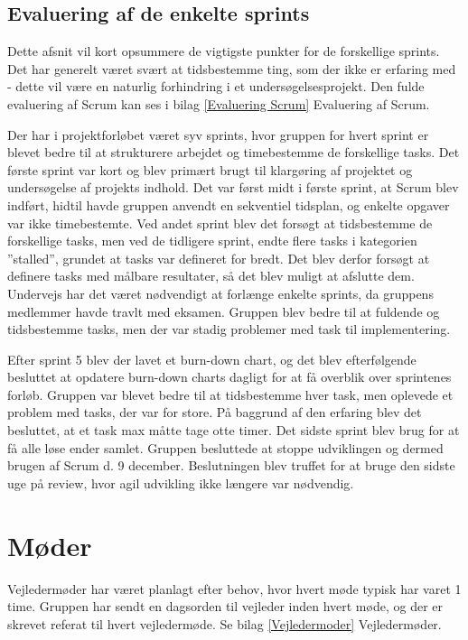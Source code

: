 \subsection{Evaluering af de enkelte sprints} 
Dette afsnit vil kort opsummere de vigtigste punkter for de forskellige sprints. Det har generelt været svært at tidsbestemme ting, som der ikke er erfaring med - dette vil være en naturlig forhindring i et undersøgelsesprojekt. Den fulde evaluering af Scrum kan ses i bilag \ref{Evaluering Scrum} Evaluering af Scrum.

Der har i projektforløbet været syv sprints, hvor gruppen for hvert sprint er blevet bedre til at strukturere arbejdet og timebestemme de forskellige tasks. Det første sprint var kort og blev primært brugt til klargøring af projektet og undersøgelse af projekts indhold. Det var først midt i første sprint, at Scrum blev indført, hidtil havde gruppen anvendt en sekventiel tidsplan, og enkelte opgaver var ikke timebestemte. Ved andet sprint blev det forsøgt at tidsbestemme de forskellige tasks, men ved de tidligere sprint, endte flere tasks i kategorien ”stalled”, grundet at tasks var defineret for bredt. Det blev derfor forsøgt at definere tasks med målbare resultater, så det blev muligt at afslutte dem. Undervejs har det været nødvendigt at forlænge enkelte sprints, da gruppens medlemmer havde travlt med eksamen. Gruppen blev bedre til at fuldende og tidsbestemme tasks, men der var stadig problemer med task til implementering. 

Efter sprint 5 blev der lavet et burn-down chart, og det blev efterfølgende besluttet at opdatere burn-down charts dagligt for at få overblik over sprintenes forløb. Gruppen var blevet bedre til at tidsbestemme hver task, men oplevede et problem med tasks, der var for store. På baggrund af den erfaring blev det besluttet, at et task max måtte tage otte timer. Det sidste sprint blev brug for at få alle løse ender samlet. Gruppen besluttede at stoppe udviklingen og dermed brugen af Scrum d. 9 december. Beslutningen blev truffet for at bruge den sidste uge på review, hvor agil udvikling ikke længere var nødvendig. 
 
\section{Møder}
Vejledermøder har været planlagt efter behov, hvor hvert møde typisk har varet 1 time. Gruppen har sendt en dagsorden til vejleder inden hvert møde, og der er skrevet referat til hvert vejledermøde. Se bilag \ref{Vejledermoder} Vejledermøder.
 
